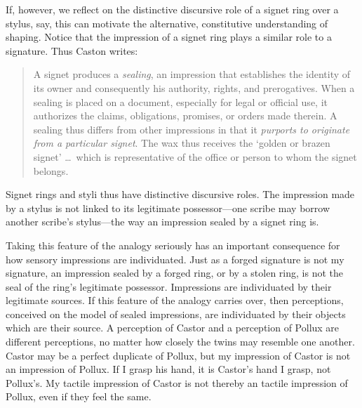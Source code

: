 If, however, we reflect on the distinctive discursive role of a signet ring over a stylus, say, this can motivate the alternative, constitutive understanding of shaping. Notice that the impression of a signet ring plays a similar role to a signature. Thus Caston writes:
\begin{quote}
	A signet produces a \emph{sealing}, an impression that establishes the identity of its owner and consequently his authority, rights, and prerogatives. When a sealing is placed on a document, especially for legal or official use, it authorizes the claims, obligations, promises, or orders made therein. A sealing thus differs from other impressions in that it \emph{purports to originate from a particular signet}. The wax thus receives the `golden or brazen signet' \ldots\ which is representative of the office or person to whom the signet belongs. \citep[302]{Caston:2005cr}
\end{quote}
Signet rings and styli thus have distinctive discursive roles. The impression made by a stylus is not linked to its legitimate possessor---one scribe may borrow another scribe’s stylus---the way an impression sealed by a signet ring is.


Taking this feature of the analogy seriously has an important consequence for how sensory impressions are individuated. Just as a forged signature is not my signature, an impression sealed by a forged ring, or by a stolen ring, is not the seal of the ring’s legitimate possessor. Impressions are individuated by their legitimate sources. If this feature of the analogy carries over, then perceptions, conceived on the model of sealed impressions, are individuated by their objects which are their source. A perception of Castor and a perception of Pollux are different perceptions, no matter how closely the twins may resemble one another. Castor may be a perfect duplicate of Pollux, but my impression of Castor is not an impression of Pollux. If I grasp his hand, it is Castor's hand I grasp, not Pollux's. My tactile impression of Castor is not thereby an tactile impression of Pollux, even if they feel the same.

